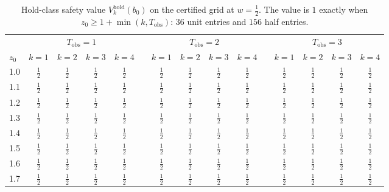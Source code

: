 \documentclass[11pt,a4paper]{article}
\theoremstyle{plain}
\theoremstyle{definition}
\theoremstyle{remark}
\newcommand{\hold}{\mathrm{hold}}
\newcommand{\Tobs}{T_{\mathrm{obs}}}
\newcommand{\tfr}[2]{\tfrac{#1}{#2}}
\begin{document}
\begin{table}[h]
\centering\footnotesize
\caption{Hold-class safety value $V^{\hold}_k(b_0)$ on the certified grid at $w=\tfr12$. The value is $1$ exactly when $z_0\ge1+\min(k,\Tobs)$: $36$ unit entries and $156$ half entries.}
\label{tab:grid}
\setlength{\tabcolsep}{4pt}
\begin{tabular}{@{}l cccc c cccc c cccc@{}}
\toprule
 & \multicolumn{4}{c}{$\Tobs=1$} & & \multicolumn{4}{c}{$\Tobs=2$} & & \multicolumn{4}{c}{$\Tobs=3$}\\
\cmidrule{2-5}\cmidrule{7-10}\cmidrule{12-15}
$z_0$ & $k{=}1$ & $k{=}2$ & $k{=}3$ & $k{=}4$ & & $k{=}1$ & $k{=}2$ & $k{=}3$ & $k{=}4$ & & $k{=}1$ & $k{=}2$ & $k{=}3$ & $k{=}4$\\
\midrule
1.0 & $\tfrac{1}{2}$ & $\tfrac{1}{2}$ & $\tfrac{1}{2}$ & $\tfrac{1}{2}$ & & $\tfrac{1}{2}$ & $\tfrac{1}{2}$ & $\tfrac{1}{2}$ & $\tfrac{1}{2}$ & & $\tfrac{1}{2}$ & $\tfrac{1}{2}$ & $\tfrac{1}{2}$ & $\tfrac{1}{2}$\\
1.1 & $\tfrac{1}{2}$ & $\tfrac{1}{2}$ & $\tfrac{1}{2}$ & $\tfrac{1}{2}$ & & $\tfrac{1}{2}$ & $\tfrac{1}{2}$ & $\tfrac{1}{2}$ & $\tfrac{1}{2}$ & & $\tfrac{1}{2}$ & $\tfrac{1}{2}$ & $\tfrac{1}{2}$ & $\tfrac{1}{2}$\\
1.2 & $\tfrac{1}{2}$ & $\tfrac{1}{2}$ & $\tfrac{1}{2}$ & $\tfrac{1}{2}$ & & $\tfrac{1}{2}$ & $\tfrac{1}{2}$ & $\tfrac{1}{2}$ & $\tfrac{1}{2}$ & & $\tfrac{1}{2}$ & $\tfrac{1}{2}$ & $\tfrac{1}{2}$ & $\tfrac{1}{2}$\\
1.3 & $\tfrac{1}{2}$ & $\tfrac{1}{2}$ & $\tfrac{1}{2}$ & $\tfrac{1}{2}$ & & $\tfrac{1}{2}$ & $\tfrac{1}{2}$ & $\tfrac{1}{2}$ & $\tfrac{1}{2}$ & & $\tfrac{1}{2}$ & $\tfrac{1}{2}$ & $\tfrac{1}{2}$ & $\tfrac{1}{2}$\\
1.4 & $\tfrac{1}{2}$ & $\tfrac{1}{2}$ & $\tfrac{1}{2}$ & $\tfrac{1}{2}$ & & $\tfrac{1}{2}$ & $\tfrac{1}{2}$ & $\tfrac{1}{2}$ & $\tfrac{1}{2}$ & & $\tfrac{1}{2}$ & $\tfrac{1}{2}$ & $\tfrac{1}{2}$ & $\tfrac{1}{2}$\\
1.5 & $\tfrac{1}{2}$ & $\tfrac{1}{2}$ & $\tfrac{1}{2}$ & $\tfrac{1}{2}$ & & $\tfrac{1}{2}$ & $\tfrac{1}{2}$ & $\tfrac{1}{2}$ & $\tfrac{1}{2}$ & & $\tfrac{1}{2}$ & $\tfrac{1}{2}$ & $\tfrac{1}{2}$ & $\tfrac{1}{2}$\\
1.6 & $\tfrac{1}{2}$ & $\tfrac{1}{2}$ & $\tfrac{1}{2}$ & $\tfrac{1}{2}$ & & $\tfrac{1}{2}$ & $\tfrac{1}{2}$ & $\tfrac{1}{2}$ & $\tfrac{1}{2}$ & & $\tfrac{1}{2}$ & $\tfrac{1}{2}$ & $\tfrac{1}{2}$ & $\tfrac{1}{2}$\\
1.7 & $\tfrac{1}{2}$ & $\tfrac{1}{2}$ & $\tfrac{1}{2}$ & $\tfrac{1}{2}$ & & $\tfrac{1}{2}$ & $\tfrac{1}{2}$ & $\tfrac{1}{2}$ & $\tfrac{1}{2}$ & & $\tfrac{1}{2}$ & $\tfrac{1}{2}$ & $\tfrac{1}{2}$ & $\tfrac{1}{2}$\\

\end{tabular}
\end{table}
\end{document}
